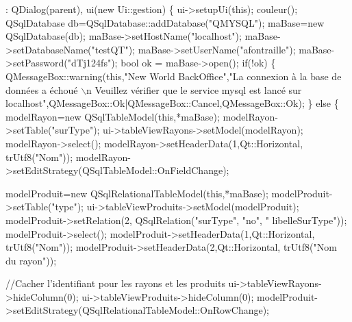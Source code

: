 \begin{DoxyCode}
                                :
    QDialog(parent),
    ui(\textcolor{keyword}{new} Ui::gestion)
\{
    ui->setupUi(\textcolor{keyword}{this});
    couleur();
    QSqlDatabase db=QSqlDatabase::addDatabase(\textcolor{stringliteral}{"QMYSQL"});
    maBase=\textcolor{keyword}{new} QSqlDatabase(db);
    maBase->setHostName(\textcolor{stringliteral}{"localhost"});
    maBase->setDatabaseName(\textcolor{stringliteral}{"testQT"});
    maBase->setUserName(\textcolor{stringliteral}{"afontraille"});
    maBase->setPassword(\textcolor{stringliteral}{"dTj124fs"});
    \textcolor{keywordtype}{bool} ok = maBase->open();
    \textcolor{keywordflow}{if}(!ok)
    \{
        QMessageBox::warning(\textcolor{keyword}{this},\textcolor{stringliteral}{"New World BackOffice"},\textcolor{stringliteral}{"La connexion à la
       base de données a échoué \(\backslash\)n Veuillez vérifier que le service mysql est lancé sur
       localhost"},QMessageBox::Ok|QMessageBox::Cancel,QMessageBox::Ok);
    \}
    \textcolor{keywordflow}{else}
    \{
        modelRayon=\textcolor{keyword}{new} QSqlTableModel(\textcolor{keyword}{this},*maBase);
        modelRayon->setTable(\textcolor{stringliteral}{"surType"});
        ui->tableViewRayons->setModel(modelRayon);
        modelRayon->select();
        modelRayon->setHeaderData(1,Qt::Horizontal, trUtf8(\textcolor{stringliteral}{"Nom"}));
        modelRayon->setEditStrategy(QSqlTableModel::OnFieldChange);

        modelProduit=\textcolor{keyword}{new} QSqlRelationalTableModel(\textcolor{keyword}{this},*maBase);
        modelProduit->setTable(\textcolor{stringliteral}{"type"});
        ui->tableViewProduits->setModel(modelProduit);
        modelProduit->setRelation(2, QSqlRelation(\textcolor{stringliteral}{"surType"}, \textcolor{stringliteral}{"no"}, \textcolor{stringliteral}{"
      libelleSurType"}));
        modelProduit->select();
        modelProduit->setHeaderData(1,Qt::Horizontal, trUtf8(\textcolor{stringliteral}{"Nom"}));
        modelProduit->setHeaderData(2,Qt::Horizontal, trUtf8(\textcolor{stringliteral}{"Nom du rayon"}));

        \textcolor{comment}{//Cacher l'identifiant pour les rayons et les produits}
        ui->tableViewRayons->hideColumn(0);
        ui->tableViewProduits->hideColumn(0);
        modelProduit->setEditStrategy(QSqlRelationalTableModel::OnRowChange);


\end{DoxyCode}

